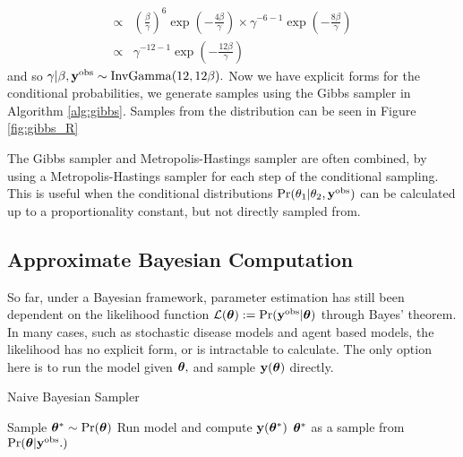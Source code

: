 \begin{example}
\begin{align*}
        \propto &
        \left(\frac{\beta}{\gamma}\right)^{6}
        \exp( -\frac{4\beta}{\gamma})
        \times \gamma^{- 6 - 1}\exp\left(-\frac{8\beta}{\gamma}\right) \\
        \propto & \gamma^{- 12 - 1}
        \exp\left(-\frac{12\beta}{\gamma}\right)
    \end{align*}
    and so
    $\gamma|\beta, \mathbf{y}^{\mathrm{obs}}
        \sim \mathrm{InvGamma}(12, 12\beta).$
    Now we have explicit forms for the conditional probabilities,
    we generate samples using the Gibbs sampler in Algorithm \ref{alg:gibbs}.
    Samples from the distribution can be seen in Figure \ref{fig:gibbs_R}
\end{example}

The Gibbs sampler and Metropolis-Hastings sampler are often combined, by
using a Metropolis-Hastings sampler for each step of the conditional sampling.
This is useful when the conditional distributions
$\Pr(\theta_1 | \theta_2, \mathbf{y}^{\mathrm{obs}})$ can be calculated up to a proportionality
constant, but not directly sampled from.

\subsection*{Approximate Bayesian Computation}

So far, under a Bayesian framework, parameter estimation has still been
dependent on the likelihood function
$\mathcal{L}(\bm{\theta}) := \Pr(\mathbf{y}^{\mathrm{obs}}|\bm{\theta})$ through Bayes' theorem.
In many cases, such as stochastic disease models and agent based models, the
likelihood has no explicit form, or is intractable to calculate.
The only option here is to run the model given $\bm{\theta},$
and sample $\mathbf{y}(\bm{\theta})$ directly.

\begin{algorithm}[htbp]
    \caption{Naive Bayesian Sampler}
    \label{alg:naive_samp}
    \begin{algorithmic}[1]
        \State Sample $\bm{\theta}^\ast \sim \Pr(\bm{\theta})$
        \State Run model and compute $\mathbf{y}(\bm{\theta}^\ast)$
        \If{$\by(\btheta^\ast) = \by^\obs$}
        \State \Return $\bm{\theta}^\ast$ as a sample from $\Pr(\bm{\theta}|\mathbf{y}^{\mathrm{obs}}.)$
        \EndIf
    \end{algorithmic}
\end{algorithm}

